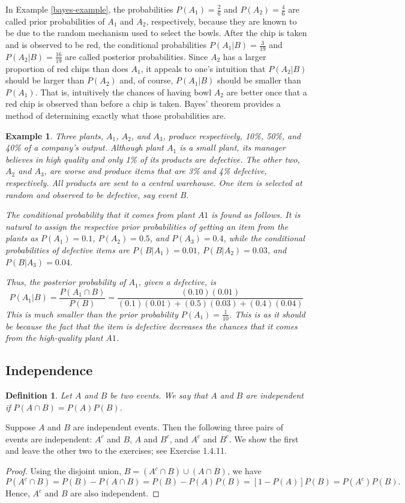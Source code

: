 \documentclass[12pt]{article}
\newtheorem{definition}[theorem]{Definition}
\newtheorem{example}[theorem]{Example}
\newcommand{\1}{{\bf 1}}
\newcommand{\2}{{\bf 2}}
\begin{document}
In Example \ref{bayes-example}, the probabilities $P(A_1) = \frac{2}{6}$ and $P(A_2) = \frac{4}{6}$ are called prior probabilities of $A_1$ and $A_2$, respectively, because they are known to be due to the random mechanism used to select the bowls. After the chip is taken and is observed to be red, the conditional probabilities $P(A_1|B) = \frac{3}{19}$ and $P(A_2|B) = \frac{16}{19}$ are called posterior probabilities. Since $A_2$ has a larger proportion of red chips than does $A_1$, it appeals to one’s intuition that $P(A_2|B)$ should be larger than $P(A_2)$ and, of course, $P(A_1|B)$ should be smaller than $P(A_1)$. That is, intuitively the chances of having bowl $A_2$ are better once that a red chip is observed than before a chip is taken. Bayes’ theorem provides a method of determining exactly what those probabilities are.
\begin{example}
Three plants, $A_1$, $A_2$, and $A_3$, produce respectively, 10\%, 50\%, and 40\% of a company’s output. Although plant $A_1$ is a small plant, its manager believes in high quality and only 1\% of its products are defective. The other two, $A_2$ and $A_3$, are worse and produce items that are 3\% and 4\% defective, respectively. All products are sent to a central warehouse. One item is selected at random and observed to be defective, say event B.

The conditional probability that it comes from plant $A1$ is found as follows. It is natural to assign the respective prior probabilities of getting an item from the plants as $P(A_1) = 0.1$, $P(A_2) = 0.5$, and $P(A_3) = 0.4$, while the conditional probabilities of defective items are $P(B|A_1) = 0.01$, $P(B|A_2) = 0.03$, and $P(B|A_3) = 0.04$.

Thus, the posterior probability of $A_1$, given a defective, is
\[
P(A_1|B) = \frac{P(A_1 \cap B)}{P(B)} = \frac{(0.10)(0.01)}{(0.1)(0.01) + (0.5)(0.03) + (0.4)(0.04)}
\]
This is much smaller than the prior probability $P(A_1) = \frac{1}{10}$. This is as it should be because the fact that the item is defective decreases the chances that it comes from the high-quality plant $A1$.
\end{example}
\subsection{Independence}
\begin{definition}
Let $A$ and $B$ be two events. We say that $A$ and $B$ are independent if $P(A \cap B) = P(A)P(B)$.
\end{definition}
Suppose $A$ and $B$ are independent events. Then the following three pairs of events are independent: $A^c$ and $B$, $A$ and $B^c$, and $A^c$ and $B^c$. We show the first and leave the other two to the exercises; see Exercise 1.4.11. 
\begin{proof}
Using the disjoint union, $B = (A^c \cap B) \cup (A \cap B)$, we have
\[
P(A^c \cap B) = P(B) - P(A \cap B) = P(B) - P(A)P(B) = [1 - P(A)]P(B) = P(A^c)P(B).
\]
Hence, $A^c$ and $B$ are also independent.    
\end{proof}
\end{document}
